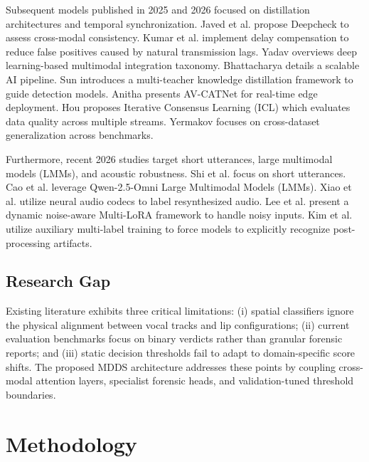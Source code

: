 \documentclass[conference]{IEEEtran}
\begin{document}
Subsequent models published in 2025 and 2026 focused on distillation architectures and temporal synchronization. Javed et al. \cite{javed2025deepcheck} propose Deepcheck to assess cross-modal consistency. Kumar et al. \cite{kumar2025robust} implement delay compensation to reduce false positives caused by natural transmission lags. Yadav \cite{yadav2026multimodal} overviews deep learning-based multimodal integration taxonomy. Bhattacharya \cite{bhattacharya2026multimodal} details a scalable AI pipeline. Sun \cite{sun2026audiovisual} introduces a multi-teacher knowledge distillation framework to guide detection models. Anitha \cite{anitha2026robust} presents AV-CATNet for real-time edge deployment. Hou \cite{hou2026deepfake} proposes Iterative Consensus Learning (ICL) which evaluates data quality across multiple streams. Yermakov \cite{yermakov2026deepfake} focuses on cross-dataset generalization across benchmarks.

Furthermore, recent 2026 studies target short utterances, large multimodal models (LMMs), and acoustic robustness. Shi et al. \cite{shi2026audio} focus on short utterances. Cao et al. \cite{cao2026leveraging} leverage Qwen-2.5-Omni Large Multimodal Models (LMMs). Xiao et al. \cite{xiao2026how} utilize neural audio codecs to label resynthesized audio. Lee et al. \cite{lee2026dynamic} present a dynamic noise-aware Multi-LoRA framework to handle noisy inputs. Kim et al. \cite{kim2026auxiliary} utilize auxiliary multi-label training to force models to explicitly recognize post-processing artifacts.

\subsection{Research Gap}
Existing literature exhibits three critical limitations: (i) spatial classifiers ignore the physical alignment between vocal tracks and lip configurations; (ii) current evaluation benchmarks focus on binary verdicts rather than granular forensic reports; and (iii) static decision thresholds fail to adapt to domain-specific score shifts. The proposed MDDS architecture addresses these points by coupling cross-modal attention layers, specialist forensic heads, and validation-tuned threshold boundaries.

\section{Methodology}
\end{document}
